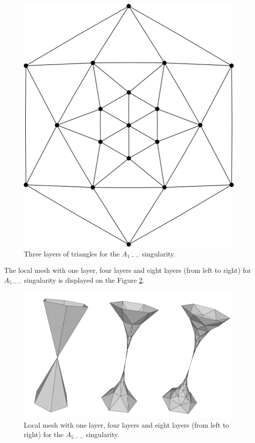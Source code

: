 \begin{figure}
    \centerline{\includegraphics[scale=0.5]{images/img52}}
    \caption[Three layers of triangles for the $A_{1--}$ singularity]
    {Three layers of triangles for the $A_{1--}$ singularity.}
    \label{img:52}
\end{figure}

The local mesh with one layer, four layers and eight layers (from left to right) 
for $A_{5--}$ singularity is displayed
on the Figure \ref{img:53}. 
\begin{figure}
    \centerline{\includegraphics[scale=0.4]{images/img53}}
    \caption[Local mesh with layers for the $A_{5--}$ singularity]
    {Local mesh with one layer, four layers and eight layers (from left to right) 
    for the $A_{5--}$ singularity.}
    \label{img:53}
\end{figure}

